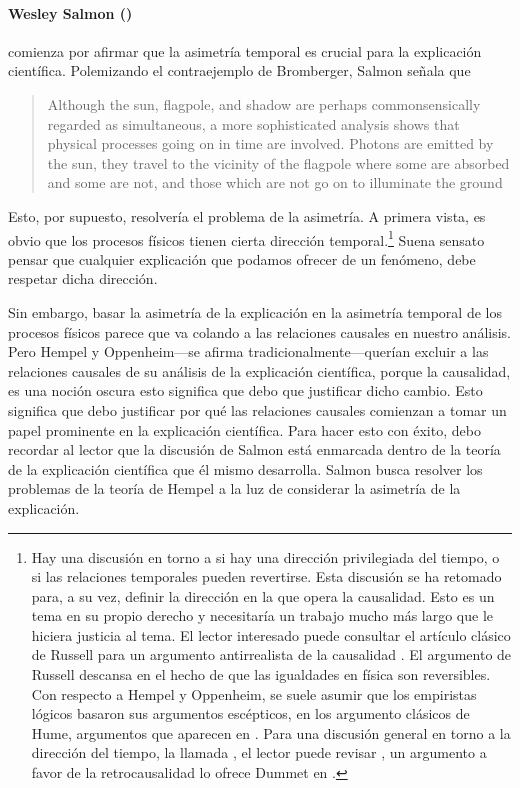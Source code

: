 \paragraph{Wesley Salmon (\citeyear{Salmon1970})} comienza
por afirmar que la asimetría temporal es crucial para la
explicación científica. Polemizando el contraejemplo de
Bromberger, Salmon señala que

 \begin{quote} 
    Although the sun, flagpole, and shadow are perhaps
    commonsensically regarded as simultaneous, a more
    sophisticated analysis shows that physical processes
    going on in time are involved.	Photons are emitted by
    the sun, they travel to the	vicinity of the flagpole
    where some are absorbed and some are not, and those
    which are not go on to illuminate the ground
    \parencite[p.~72]{Salmon1970}
 \end{quote}

Esto, por supuesto, resolvería el problema de la asimetría.
A primera vista, es obvio que los procesos físicos tienen
cierta dirección temporal.\footnote{ 
  Hay una discusión en torno a si hay una dirección
  privilegiada del tiempo, o si las relaciones temporales
  pueden revertirse. Esta discusión se ha retomado para, a
  su vez, definir la dirección en la que opera la
  causalidad. Esto es un tema en su propio derecho y
  necesitaría un trabajo mucho más largo que le hiciera
  justicia al tema. El lector interesado puede consultar el
  artículo clásico de Russell para un argumento
  antirrealista de la causalidad
  \parencite{onthecauserussell}. El argumento de Russell
  descansa en el hecho de que las igualdades en física son
  reversibles. Con respecto a Hempel y Oppenheim, se suele
  asumir que los empiristas lógicos basaron sus argumentos
  escépticos, en los argumento clásicos de Hume, argumentos
  que aparecen en \parencite{hume1784}. Para una discusión
  general en torno a la dirección del tiempo, la llamada
  , el lector puede revisar
  \parencite{utmArrowTime}, un argumento a favor de la
  retrocausalidad lo ofrece Dummet en
  \parencite{dummetcause}.
}
Suena sensato pensar que cualquier explicación que podamos
ofrecer de un fenómeno, debe respetar dicha dirección.

Sin embargo, basar la asimetría de la explicación en la
asimetría temporal de los procesos físicos parece que va
colando a las relaciones causales en nuestro análisis. Pero
Hempel y Oppenheim---se afirma tradicionalmente---querían 
excluir a las relaciones causales
de su análisis de la explicación científica, porque la
causalidad, es una noción oscura esto significa que debo
que justificar dicho cambio. Esto significa que debo
justificar por qué las relaciones causales comienzan a tomar
un papel prominente en la explicación científica. Para hacer
esto con éxito, debo recordar al lector que la discusión de
Salmon está enmarcada dentro de la teoría de la explicación
científica que él mismo desarrolla. Salmon busca resolver
los problemas de la teoría de Hempel a la luz de considerar
la asimetría de la explicación.

